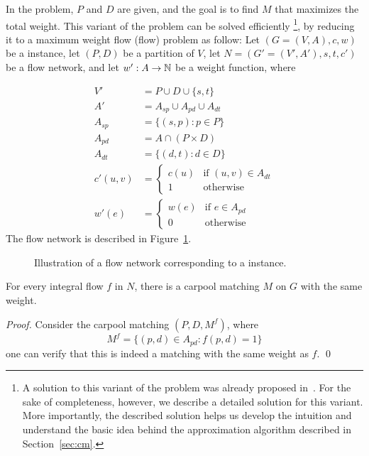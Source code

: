 \label{sec:fixed}
In the \textsc{\FIXEDCARPOOL{}} problem, $P$ and $D$ are given, 
and the goal is to find $M$ that maximizes the total weight. 
This variant of the problem can be solved efficiently
\footnote{A solution to this variant of the problem was already proposed in~\cite{hartman2014theory}.
For the sake of completeness, however, we describe a detailed solution for this variant. 
More importantly, 
the described solution helps us develop the intuition and understand the basic idea behind the
approximation algorithm described in Section~\ref{sec:cm}.   
},
by reducing it to a maximum weight flow (flow) problem as
follow:
Let $(G = (V, A), c, w)$ be a \CARPOOL{} instance,
let $(P, D)$ be a partition of $V$,
let  $N = (G' = (V', A'), s, t, c')$ be a flow network, 
and let $w' : A \rightarrow \mathbb{N}$ be a weight function, where 

\begin{align*}
V'			& = P \cup D \cup \{s, t\}										\\
A'			& = A_{sp} \cup A_{pd} \cup A_{dt}								\\
A_{sp}		& =	\{(s, p) : p \in P \}										\\
A_{pd}		& =	A \cap (P \times D)											\\
A_{dt}		& =	\{(d, t) : d \in D \}										\\
c'(u, v)	& = 
				\begin{cases}
				c(u) & \text{if } (u, v) \in A_{dt} 						\\
				1 & \text{otherwise}
				\end{cases}
																			\\
w'(e)			& = 
				\begin{cases}
				w(e) & \text{if } e \in A_{pd} 								\\
				0 & \text{otherwise}	
				\end{cases}
\end{align*}
The flow network is described in Figure~\ref{fig:flow}.
\begin{figure}
\centering

\caption{
\label{fig:flow}
Illustration of a flow network corresponding to a \FIXEDCARPOOL{} instance.}
\end{figure}

\begin{observation}
For every integral flow $f$ in $N$, there is a carpool matching $M$ on $G$ with
the same weight.
\end{observation}

\begin{proof}
Consider the carpool matching $(P, D, M^f)$, where 
$$ M^f = \{(p, d) \in A_{pd} : f(p, d) = 1\} $$
one can verify that this is indeed a matching with the same weight as $f$.
\qed\end{proof}

